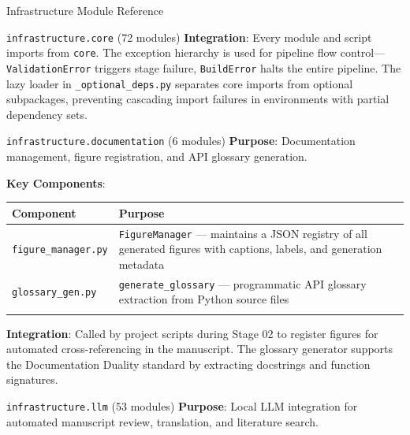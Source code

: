 \documentclass[
  ignorenonframetext,
]{beamer}
\newcounter{none} %
\begin{document}
\begin{frame}[fragile]{Infrastructure Module Reference}
\begin{block}{\texttt{infrastructure.core} (72 modules)}
\textbf{Integration}: Every module and script imports from
\texttt{core}. The exception hierarchy is used for pipeline flow
control---\texttt{ValidationError} triggers stage failure,
\texttt{BuildError} halts the entire pipeline. The lazy loader in
\texttt{\_optional\_deps.py} separates core imports from optional
subpackages, preventing cascading import failures in environments with
partial dependency sets.
\end{block}

\begin{block}{\texttt{infrastructure.documentation} (6 modules)}
\protect{}\label{infrastructure.documentation-6-modules}
\textbf{Purpose}: Documentation management, figure registration, and API
glossary generation.

\textbf{Key Components}:

{\def\LTcaptype{none} %
\begin{longtable}[]{@{}
  >{\raggedright\arraybackslash}p{}
  >{\raggedright\arraybackslash}p{}@{}}
\toprule\noalign{}
\begin{minipage}[b]{\linewidth}\raggedright
Component
\end{minipage} & \begin{minipage}[b]{\linewidth}\raggedright
Purpose
\end{minipage} \\
\midrule\noalign{}
\endhead
\texttt{figure\_manager.py} & \texttt{FigureManager} --- maintains a
JSON registry of all generated figures with captions, labels, and
generation metadata \\
\texttt{glossary\_gen.py} & \texttt{generate\_glossary} --- programmatic
API glossary extraction from Python source files \\
\bottomrule\noalign{}
\end{longtable}
}

\textbf{Integration}: Called by project scripts during Stage 02 to
register figures for automated cross-referencing in the manuscript. The
glossary generator supports the Documentation Duality standard by
extracting docstrings and function signatures.
\end{block}

\begin{block}{\texttt{infrastructure.llm} (53 modules)}
\protect{}\label{infrastructure.llm-53-modules}
\textbf{Purpose}: Local LLM integration for automated manuscript review,
translation, and literature search.


\end{block}
\end{frame}
\end{document}
